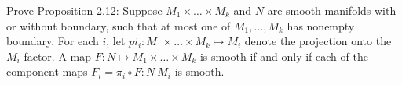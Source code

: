 Prove Proposition 2.12: Suppose $M_1\times\ldots\times M_k$ and $N$ are smooth manifolds with or without boundary, such that at most one of $M_1,\ldots,M_k$ has nonempty boundary. For each $i$, let $pi_i:M_1\times\ldots\times M_k \mapsto M_i$ denote the projection onto the $M_i$ factor. A map $F:N \mapsto M_1\times\ldots\times M_k$ is smooth if and only if each of the component maps $F_i=\pi_i \circ F:N \ M_i$ is smooth.